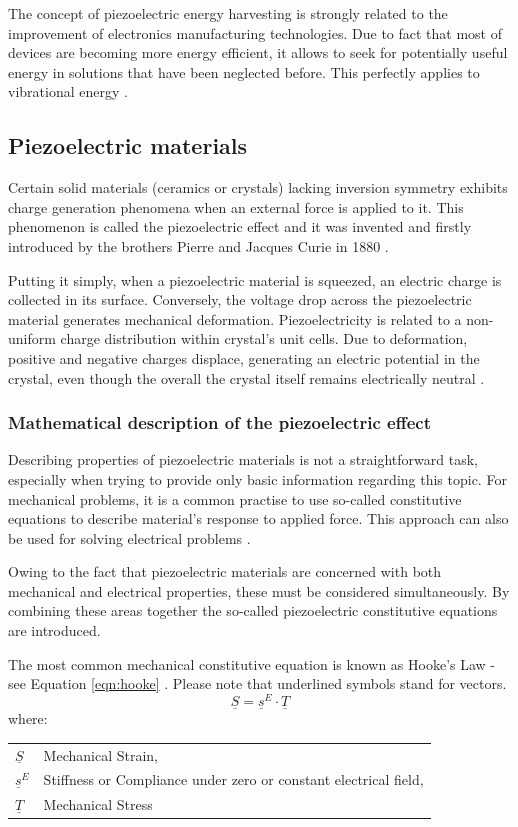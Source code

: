 \documentclass[12pt,a4paper]{article}
\makeatletter
\newenvironment{conditions}
  {\par\vspace{\abovedisplayskip}\noindent\begin{tabular}{>{$}l<{$} @{${}-{}$} l}}
  {\end{tabular}\par\vspace{\belowdisplayskip}}
\makeatother
\begin{document}
The concept of piezoelectric energy harvesting is strongly related to the improvement of electronics manufacturing technologies. Due to fact that most of devices are becoming more energy efficient, it allows to seek for potentially useful energy in solutions that have been neglected before. This perfectly applies to vibrational energy \cite{low_freq}.

\subsection{Piezoelectric materials}
Certain solid materials (ceramics or crystals) lacking inversion symmetry exhibits charge generation phenomena when an external force is applied to it. This phenomenon is called the piezoelectric effect and it was invented and firstly introduced by the brothers Pierre and Jacques Curie in 1880 \cite{cmos}.\par
Putting it simply, when a piezoelectric material is squeezed, an electric charge is collected in its surface. Conversely, the voltage drop across the piezoelectric material generates mechanical deformation. Piezoelectricity is related to a non-uniform charge distribution within crystal's unit cells. Due to deformation, positive and negative charges displace, generating an electric potential in the crystal, even though the overall the crystal itself remains electrically neutral \cite{EnHv2}.
\subsubsection{Mathematical description of the piezoelectric effect}
Describing properties of piezoelectric materials is not a straightforward task, especially when trying to provide only basic information regarding this topic. For mechanical problems, it is a common practise to use so-called constitutive equations to describe material's response to applied force. This approach can also be used for solving electrical problems \cite{piezomath}.
\par
Owing to the fact that piezoelectric materials are concerned with both mechanical and electrical properties, these must be considered simultaneously. By combining these areas together the so-called piezoelectric constitutive equations are introduced.
\par
The most common mechanical constitutive equation is known as Hooke's Law -see Equation \ref{eqn:hooke} \cite{piezomath}. Please note that underlined symbols stand for vectors.
\begin{equation}
	\underline{S} = \underline{s}^E \cdot \underline{T}
	\label{eqn:hooke}
\end{equation}
where:
\begin{conditions}
	\underline{S}     &  Mechanical Strain, \\
 	\underline{s}^E     &  Stiffness or Compliance under zero or constant electrical field, \\   
 	\underline{T} &  Mechanical Stress	
\end{conditions}
\end{document}
